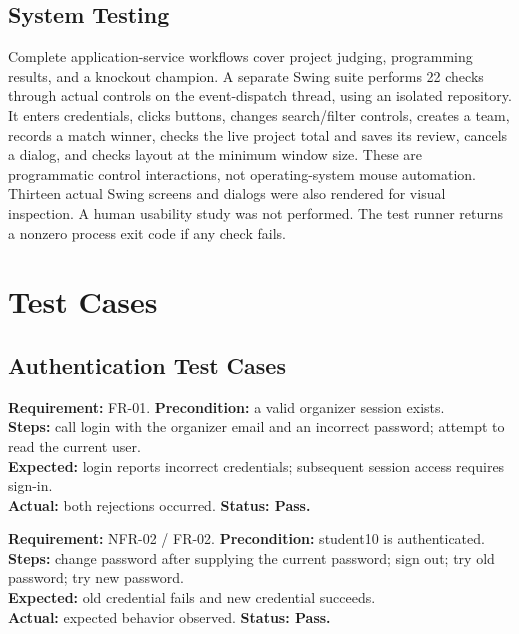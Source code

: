 \documentclass[12pt]{article}
\begin{document}
\subsection{System Testing}
Complete application-service workflows cover project judging, programming results, and a knockout champion. A separate Swing suite performs 22 checks through actual controls on the event-dispatch thread, using an isolated repository. It enters credentials, clicks buttons, changes search/filter controls, creates a team, records a match winner, checks the live project total and saves its review, cancels a dialog, and checks layout at the minimum window size. These are programmatic control interactions, not operating-system mouse automation. Thirteen actual Swing screens and dialogs were also rendered for visual inspection. A human usability study was not performed. The test runner returns a nonzero process exit code if any check fails.

\clearpage\section{Test Cases}
\subsection{Authentication Test Cases}
\begin{contentbox}
\textbf{Requirement:} FR-01. \textbf{Precondition:} a valid organizer session exists.\\
\textbf{Steps:} call login with the organizer email and an incorrect password; attempt to read the current user.\\
\textbf{Expected:} login reports incorrect credentials; subsequent session access requires sign-in.\\
\textbf{Actual:} both rejections occurred. \textbf{Status: Pass.}
\end{contentbox}
\begin{contentbox}
\textbf{Requirement:} NFR-02 / FR-02. \textbf{Precondition:} student10 is authenticated.\\
\textbf{Steps:} change password after supplying the current password; sign out; try old password; try new password.\\
\textbf{Expected:} old credential fails and new credential succeeds.\\
\textbf{Actual:} expected behavior observed. \textbf{Status: Pass.}
\end{contentbox}
\end{document}
